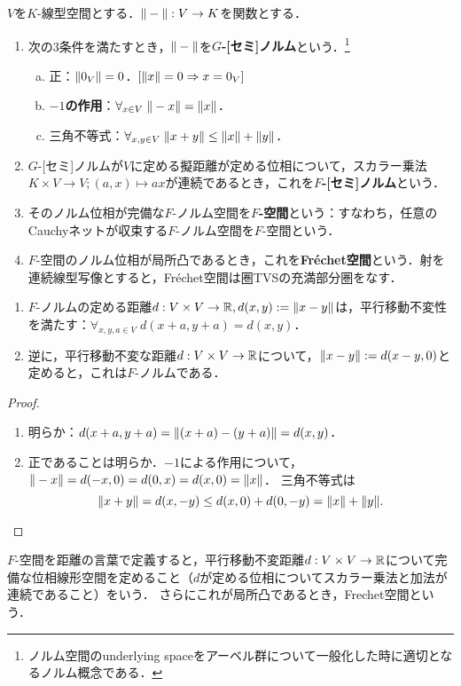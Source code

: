 \documentclass[uplatex,dvipdfmx]{jsreport}
\begin{document}
\begin{definition}
    $V$を$K$-線型空間とする．$\|-\|:V\to K$を関数とする．
    \begin{enumerate}
        \item 次の3条件を満たすとき，$\|-\|$を\textbf{$G$-[セミ]ノルム}という．\footnote{ノルム空間のunderlying spaceをアーベル群について一般化した時に適切となるノルム概念である．}
        \begin{enumerate}[(a)]
            \item 正：$\|0_V\|=0$．$[\|x\|=0\Rightarrow x=0_V]$
            \item \textbf{$-1$の作用}：$\forall_{x\in V}\;\|-x\|=\|x\|$．
            \item 三角不等式：$\forall_{x,y\in V}\;\|x+y\|\le\|x\|+\|y\|$．
        \end{enumerate}
        \item $G$-[セミ]ノルムが$V$に定める擬距離が定める位相について，スカラー乗法$K\times V\to V;(a,x)\mapsto ax$が連続であるとき，これを\textbf{$F$-[セミ]ノルム}という．
        \item そのノルム位相が完備な$F$-ノルム空間を\textbf{$F$-空間}という：すなわち，任意のCauchyネットが収束する$F$-ノルム空間を$F$-空間という．
        \item $F$-空間のノルム位相が局所凸であるとき，これを\textbf{Fréchet空間}という．射を連続線型写像とすると，Fréchet空間は圏TVSの充満部分圏をなす．
    \end{enumerate}
\end{definition}

\begin{lemma}\mbox{}
    \begin{enumerate}
        \item $F$-ノルムの定める距離$d:V\times V\to \mathbb{R},d(x,y):=\|x-y\|$は，平行移動不変性を満たす：$\forall_{x,y,a\in V}\;d(x+a,y+a)=d(x,y)$．
        \item 逆に，平行移動不変な距離$d:V\times V\to \mathbb{R}$について，$\|x-y\|:=d(x-y,0)$と定めると，これは$F$-ノルムである．
    \end{enumerate}
\end{lemma}
\begin{proof}\mbox{}
    \begin{enumerate}
        \item 明らか：$d(x+a,y+a)=\|(x+a)-(y+a)\|=d(x,y)$．
        \item 正であることは明らか．$-1$による作用について，$\|-x\|=d(-x,0)=d(0,x)=d(x,0)=\|x\|$．
        三角不等式は
        \[\|x+y\|=d(x,-y)\le d(x,0)+d(0,-y)=\|x\|+\|y\|.\]
    \end{enumerate}
\end{proof}
\begin{remarks}[距離の言葉による特徴付け]
    $F$-空間を距離の言葉で定義すると，平行移動不変距離$d:V\times V\to \mathbb{R}$について完備な位相線形空間を定めること（$d$が定める位相についてスカラー乗法と加法が連続であること）をいう．
    さらにこれが局所凸であるとき，Frechet空間という．
\end{remarks}
\end{document}
